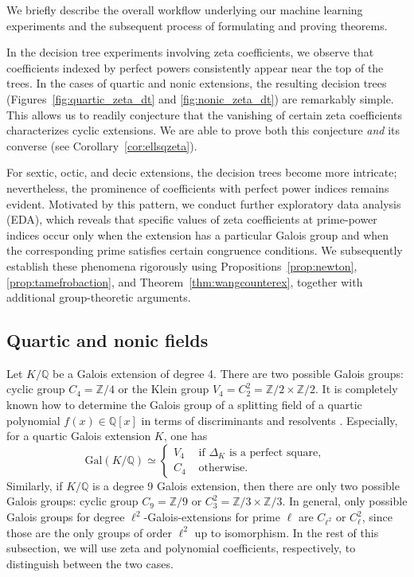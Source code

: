 \documentclass[letterpaper, 10pt]{article}
\newcommand{\Gal}{\mathrm{Gal}}
\newcommand{\bQ}{\mathbb{Q}}
\newcommand{\bZ}{\mathbb{Z}}
\newcommand{\1}{\mathds{1}}	%
\theoremstyle{definition}
\theoremstyle{remark}
\begin{document}
We briefly describe the overall workflow underlying our machine learning experiments and the subsequent process of formulating and proving theorems.

In the decision tree experiments involving zeta coefficients, we observe that coefficients indexed by perfect powers consistently appear near the top of the trees. In the cases of quartic and nonic extensions, the resulting decision trees (Figures~\ref{fig:quartic_zeta_dt} and \ref{fig:nonic_zeta_dt}) are remarkably simple. This allows us to readily conjecture that the vanishing of certain zeta coefficients characterizes cyclic extensions. We are able to prove both this conjecture \emph{and} its converse (see Corollary~\ref{cor:ellsqzeta}).

For sextic, octic, and decic extensions, the decision trees become more intricate; nevertheless, the prominence of coefficients with perfect power indices remains evident. Motivated by this pattern, we conduct further exploratory data analysis (EDA), which reveals that specific values of zeta coefficients at prime-power indices occur only when the extension has a particular Galois group and when the corresponding prime satisfies certain congruence conditions. We subsequently establish these phenomena rigorously using Propositions~\ref{prop:newton}, \ref{prop:tamefrobaction}, and Theorem~\ref{thm:wangcounterex}, together with additional group-theoretic arguments.


\subsection{Quartic and nonic fields}
\label{subsec:galois_quartic_nonic}

Let $K/\bQ$ be a Galois extension of degree 4.
There are two possible Galois groups: cyclic group $C_{4} = \bZ / 4$ or the Klein group $V_{4} = C_2^2 = \bZ / 2 \times \bZ / 2$.
It is completely known how to determine the Galois group of a splitting field of a quartic polynomial $f(x) \in \bQ[x]$ in terms of discriminants and resolvents \cite[p. 613]{dummit2004abstract}.
Especially, for a quartic Galois extension $K$, one has
\begin{equation}
    \label{eqn:quartic_disc}
    \Gal(K / \bQ) \simeq \begin{cases}
        V_4 & \text{ if } \Delta_K \text{ is a perfect square, } \\
        C_4 & \text{ otherwise. } 
    \end{cases}
\end{equation}
Similarly, if $K / \bQ$ is a degree 9 Galois extension, then there are only two possible Galois groups: cyclic group $C_9 = \bZ / 9$ or $C_3^2 = \bZ / 3 \times \bZ / 3$.
In general, only possible Galois groups for degree $\ell^2$-Galois-extensions for prime $\ell$ are $C_{\ell^2}$ or $C_\ell^2$, since those are the only groups of order $\ell^2$ up to isomorphism. In the rest of this subsection, we will use zeta and polynomial coefficients, respectively, to distinguish between the two cases. 
\end{document}
